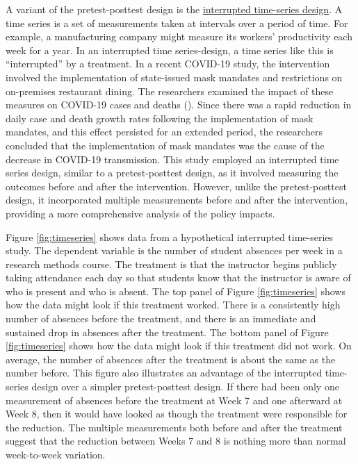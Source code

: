 \documentclass[
]{krantz}
\begin{document}
A variant of the pretest-posttest design is the \hyperref[interrupted-time-series-design-1]{interrupted time-series design}. A time series is a set of measurements taken at intervals over a period of time. For example, a manufacturing company might measure its workers' productivity each week for a year. In an interrupted time series-design, a time series like this is ``interrupted'' by a treatment. In a recent COVID-19 study, the intervention involved the implementation of state-issued mask mandates and restrictions on on-premises restaurant dining. The researchers examined the impact of these measures on COVID-19 cases and deaths (). Since there was a rapid reduction in daily case and death growth rates following the implementation of mask mandates, and this effect persisted for an extended period, the researchers concluded that the implementation of mask mandates was the cause of the decrease in COVID-19 transmission. This study employed an interrupted time series design, similar to a pretest-posttest design, as it involved measuring the outcomes before and after the intervention. However, unlike the pretest-posttest design, it incorporated multiple measurements before and after the intervention, providing a more comprehensive analysis of the policy impacts.

Figure \ref{fig:timeseries} shows data from a hypothetical interrupted time-series study. The dependent variable is the number of student absences per week in a research methods course. The treatment is that the instructor begins publicly taking attendance each day so that students know that the instructor is aware of who is present and who is absent. The top panel of Figure \ref{fig:timeseries} shows how the data might look if this treatment worked. There is a consistently high number of absences before the treatment, and there is an immediate and sustained drop in absences after the treatment. The bottom panel of Figure \ref{fig:timeseries} shows how the data might look if this treatment did not work. On average, the number of absences after the treatment is about the same as the number before. This figure also illustrates an advantage of the interrupted time-series design over a simpler pretest-posttest design. If there had been only one measurement of absences before the treatment at Week 7 and one afterward at Week 8, then it would have looked as though the treatment were responsible for the reduction. The multiple measurements both before and after the treatment suggest that the reduction between Weeks 7 and 8 is nothing more than normal week-to-week variation.
\end{document}
